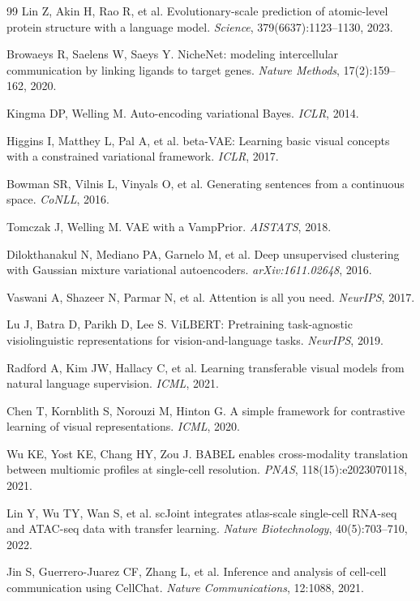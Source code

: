 \documentclass[11pt,a4paper]{article}
\begin{document}
\begin{thebibliography}{99}
Lin Z, Akin H, Rao R, et al.
Evolutionary-scale prediction of atomic-level protein structure with a language model.
\textit{Science}, 379(6637):1123--1130, 2023.

Browaeys R, Saelens W, Saeys Y.
NicheNet: modeling intercellular communication by linking ligands to target genes.
\textit{Nature Methods}, 17(2):159--162, 2020.

Kingma DP, Welling M.
Auto-encoding variational Bayes.
\textit{ICLR}, 2014.

Higgins I, Matthey L, Pal A, et al.
beta-VAE: Learning basic visual concepts with a constrained variational framework.
\textit{ICLR}, 2017.

Bowman SR, Vilnis L, Vinyals O, et al.
Generating sentences from a continuous space.
\textit{CoNLL}, 2016.

Tomczak J, Welling M.
VAE with a VampPrior.
\textit{AISTATS}, 2018.

Dilokthanakul N, Mediano PA, Garnelo M, et al.
Deep unsupervised clustering with Gaussian mixture variational autoencoders.
\textit{arXiv:1611.02648}, 2016.

Vaswani A, Shazeer N, Parmar N, et al.
Attention is all you need.
\textit{NeurIPS}, 2017.

Lu J, Batra D, Parikh D, Lee S.
ViLBERT: Pretraining task-agnostic visiolinguistic representations for vision-and-language tasks.
\textit{NeurIPS}, 2019.

Radford A, Kim JW, Hallacy C, et al.
Learning transferable visual models from natural language supervision.
\textit{ICML}, 2021.

Chen T, Kornblith S, Norouzi M, Hinton G.
A simple framework for contrastive learning of visual representations.
\textit{ICML}, 2020.

Wu KE, Yost KE, Chang HY, Zou J.
BABEL enables cross-modality translation between multiomic profiles at single-cell resolution.
\textit{PNAS}, 118(15):e2023070118, 2021.

Lin Y, Wu TY, Wan S, et al.
scJoint integrates atlas-scale single-cell RNA-seq and ATAC-seq data with transfer learning.
\textit{Nature Biotechnology}, 40(5):703--710, 2022.

Jin S, Guerrero-Juarez CF, Zhang L, et al.
Inference and analysis of cell-cell communication using CellChat.
\textit{Nature Communications}, 12:1088, 2021.


\end{thebibliography}
\end{document}
